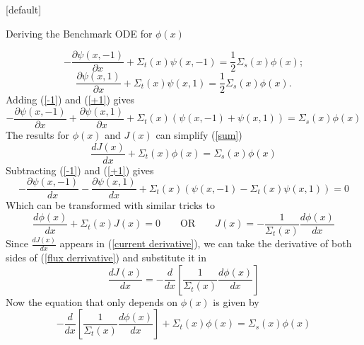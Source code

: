 \documentclass[9pt,t]{beamer}
\makeatletter
\newcommand{\QOR}{\qquad \text{OR} \qquad}
\newenvironment{withoutheadline}{
       \setbeamertemplate{headline}[default]
       \def\beamer@entrycode{\vspace*{-\headheight}}
    }{}
\makeatother
\begin{document}
\begin{withoutheadline}
\begin{frame}[allowframebreaks]{Deriving the Benchmark ODE for $\phi(x)$}
\begin{itemize}
        \begin{equation} \label{-1}
            -\frac{\partial \psi(x,-1)}{\partial x} + \Sigma_{t}(x)\psi(x,-1) =
            \frac{1}{2}\Sigma_{s}(x) \phi(x);
        \end{equation}
        \begin{equation} \label{+1}
            \frac{\partial \psi(x,1)}{\partial x} + \Sigma_{t}(x)\psi(x,1) =
            \frac{1}{2}\Sigma_{s}(x) \phi(x).
        \end{equation}
        Adding (\ref{-1}) and (\ref{+1}) gives
        \begin{equation}\label{sum}
            -\frac{\partial \psi(x,-1)}{\partial x} + \frac{\partial \psi(x,1)}{\partial x} + \Sigma_{t}(x)\left(\psi(x,-1) + \psi(x,1) \right) =
            \Sigma_{s}(x) \phi(x)
        \end{equation}
        The results for $\phi(x)$ and $J(x)$ can simplify (\ref{sum})
        \begin{equation}  \label{current derivative}
            \frac{dJ(x)}{ dx} + \Sigma_{t}(x)\phi(x) =
            \Sigma_{s}(x) \phi(x)
        \end{equation}
        Subtracting  (\ref{-1}) and (\ref{+1}) gives
        \begin{equation}
            -\frac{\partial \psi(x,-1)}{dx}
            - \frac{\partial \psi(x,1)}{d x} + \Sigma_{t}(x)\left(\psi(x,-1)  - \Sigma_{t}(x)\psi(x,1)\right) =
            0
        \end{equation}
        Which can be transformed with similar tricks to
        \begin{equation} \label{flux derrivative}
            \frac{d\phi(x)}{dx} + \Sigma_{t}(x)J(x) = 0 \QOR
            J(x) = - \frac{1}{\Sigma_{t}(x)} \frac{d\phi(x)}{dx}
        \end{equation}
        Since $\frac{dJ(x)}{dx}$ appears in (\ref{current derivative}), we can take the derivative of both sides of (\ref{flux derrivative}) and substitute it in
        \begin{equation}
          \frac{dJ(x)}{dx} =
          - \frac{d}{dx} \left\lbrack \frac{1}{\Sigma_{t}(x)} \frac{d\phi(x)}{dx} \right\rbrack
        \end{equation}
        Now the equation that only depends on $\phi(x)$ is given by
        \begin{equation}
            -\frac{d}{dx}\left\lbrack\frac{1}{\Sigma_{t}(x)} \frac{d\phi(x)}{dx} \right\rbrack + \Sigma_{t}(x)\phi(x) =
            \Sigma_{s}(x) \phi(x)
        \end{equation}

\end{itemize}
\end{frame}
\end{withoutheadline}
\end{document}
